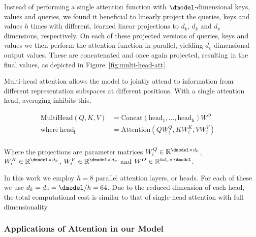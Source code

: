   Instead of performing a single attention function with $\dmodel$-dimensional keys, values and queries, we found it beneficial to linearly project the queries, keys and values $h$ times with different, learned linear projections to $d_k$, $d_k$ and $d_v$ dimensions, respectively.
  On each of these projected versions of queries, keys and values we then perform the attention function in parallel, yielding $d_v$-dimensional output values. These are concatenated and once again projected, resulting in the final values, as depicted in Figure~\ref{fig:multi-head-att}.
  
  Multi-head attention allows the model to jointly attend to information from different representation subspaces at different positions. With a single attention head, averaging inhibits this.
  
  \begin{align*}
      \mathrm{MultiHead}(Q, K, V) &= \mathrm{Concat}(\mathrm{head_1}, ..., \mathrm{head_h})W^O\\
      \text{where}~\mathrm{head_i} &= \mathrm{Attention}(QW^Q_i, KW^K_i, VW^V_i)\\
  \end{align*}
  
  Where the projections are parameter matrices $W^Q_i \in \mathbb{R}^{\dmodel \times d_k}$, $W^K_i \in \mathbb{R}^{\dmodel \times d_k}$, $W^V_i \in \mathbb{R}^{\dmodel \times d_v}$ and $W^O \in \mathbb{R}^{hd_v \times \dmodel}$.
  
  In this work we employ $h=8$ parallel attention layers, or heads. For each of these we use $d_k=d_v=\dmodel/h=64$.
  Due to the reduced dimension of each head, the total computational cost is similar to that of single-head attention with full dimensionality.
  
  \subsubsection{Applications of Attention in our Model}
  
